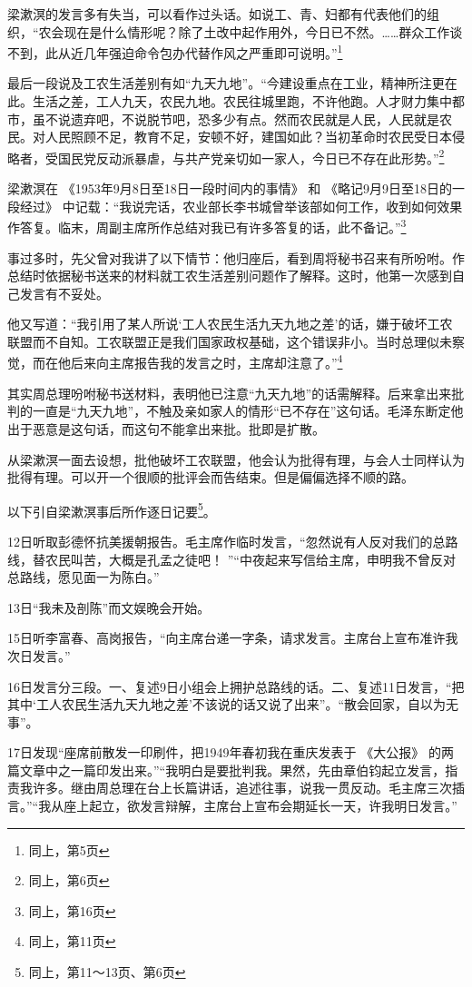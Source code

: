 \documentclass[a4paper,punct=kaiming]{ctexart}
\begin{document}
梁漱溟的发言多有失当，可以看作过头话。如说工、青、妇都有代表他们的组织，“农会现在是什么情形呢？除了土改中起作用外，今日已不然。……群众工作谈不到，此从近几年强迫命令包办代替作风之严重即可说明。”\footnote{同上，第5页}

最后一段说及工农生活差别有如“九天九地”。“今建设重点在工业，精神所注更在此。生活之差，工人九天，农民九地。农民往城里跑，不许他跑。人才财力集中都市，虽不说遗弃吧，不说脱节吧，恐多少有点。然而农民就是人民，人民就是农民。对人民照顾不足，教育不足，安顿不好，建国如此？当初革命时农民受日本侵略者，受国民党反动派暴虐，与共产党亲切如一家人，今日已不存在此形势。”\footnote{同上，第6页}

梁漱溟在 《1953年9月8日至18日一段时间内的事情》 和 《略记9月9日至18日的一段经过》 中记载：“我说完话，农业部长李书城曾举该部如何工作，收到如何效果作答复。临末，周副主席所作总结对我已有许多答复的话，此不备记。”\footnote{同上，第16页}

事过多时，先父曾对我讲了以下情节：他归座后，看到周将秘书召来有所吩咐。作总结时依据秘书送来的材料就工农生活差别问题作了解释。这时，他第一次感到自己发言有不妥处。

他又写道：“我引用了某人所说‘工人农民生活九天九地之差’的话，嫌于破坏工农联盟而不自知。工农联盟正是我们国家政权基础，这个错误非小。当时总理似未察觉，而在他后来向主席报告我的发言之时，主席却注意了。”\footnote{同上，第11页}

其实周总理吩咐秘书送材料，表明他已注意“九天九地”的话需解释。后来拿出来批判的一直是“九天九地”，不触及亲如家人的情形“已不存在”这句话。毛泽东断定他出于恶意是这句话，而这句不能拿出来批。批即是扩散。

从梁漱溟一面去设想，批他破坏工农联盟，他会认为批得有理，与会人士同样认为批得有理。可以开一个很顺的批评会而告结束。但是偏偏选择不顺的路。

以下引自梁漱溟事后所作逐日记要\footnote{同上，第11～13页、第6页}。

12日\quad 听取彭德怀抗美援朝报告。毛主席作临时发言，“忽然说有人反对我们的总路线，替农民叫苦，大概是孔孟之徒吧！ ”“中夜起来写信给主席，申明我不曾反对总路线，愿见面一为陈白。”

13日\quad “我未及剖陈”而文娱晚会开始。

15日\quad 听李富春、高岗报告，“向主席台递一字条，请求发言。主席台上宣布准许我次日发言。”

16日\quad 发言分三段。一、复述9日小组会上拥护总路线的话。二、复述11日发言，“把其中‘工人农民生活九天九地之差’不该说的话又说了出来”。“散会回家，自以为无事”。

17日\quad 发现“座席前散发一印刷件，把1949年春初我在重庆发表于 《大公报》 的两篇文章中之一篇印发出来。”“我明白是要批判我。果然，先由章伯钧起立发言，指责我许多。继由周总理在台上长篇讲话，追述往事，说我一贯反动。毛主席三次插言。”“我从座上起立，欲发言辩解，主席台上宣布会期延长一天，许我明日发言。”
\end{document}
